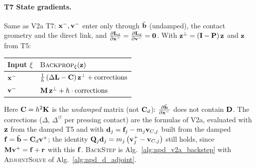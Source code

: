 \paragraph{T7 State gradients.}\mbox{}
\newline Same as V2a T7: $\mathbf{x}^-, \mathbf{v}^-$ enter only through $\tilde{\mathbf{b}}$ (undamped), the contact geometry and the direct link, and $\frac{\partial \mathbf{L}_d}{\partial \mathbf{x}^-} = \frac{\partial \mathbf{L}_d}{\partial \mathbf{v}^-} = \mathbf{0}$. With $\mathbf{z}^\perp = \left(\mathbf{I} - \mathbf{P}\right)\mathbf{z}$ and $\mathbf{z}$ from T5:
\begin{center}
\renewcommand{\arraystretch}{1.6}
\begin{tabular}{ll}
\textbf{Input} $\xi$ & $\textsc{Backprop}_\xi(\mathbf{z})$ \\ \hline
$\mathbf{x}^-$ & $\tfrac{1}{h}\left(\Delta\mathbf{L} - \mathbf{C}\right)\mathbf{z}^\perp + \text{corrections}$ \\
$\mathbf{v}^-$ & $\mathbf{M}\,\mathbf{z}^\perp + h\cdot\text{corrections}$ \\
\end{tabular}
\end{center}
\noindent Here $\mathbf{C} = h^2\mathbf{K}$ is the \emph{undamped} matrix (not $\mathbf{C}_d$): $\frac{\partial \tilde{\mathbf{b}}}{\partial \mathbf{x}^-}$ does not contain $\mathbf{D}$. The corrections ($\Delta$, $\Delta^\circlearrowleft$ per pressing contact) are the formulas of V2a, evaluated with $\mathbf{z}$ from the damped T5 and with $\mathbf{d}_j = \mathbf{f}_j - m_j\mathbf{v}_{C,j}$ built from the damped $\mathbf{f} = \tilde{\mathbf{b}} - \mathbf{C}_d\mathbf{v}^+$; the identity $\mathbf{Q}_j\mathbf{d}_j = m_j\left(\mathbf{v}_j^+ - \mathbf{v}_{C,j}\right)$ still holds, since $\mathbf{M}\mathbf{v}^+ = \mathbf{f} + \mathbf{r}$ with this $\mathbf{f}$. \textsc{BackStep} is Alg.~\ref{alg:npd_v2a_backstep} with \textsc{AdjointSolve} of Alg.~\ref{alg:npd_d_adjoint}.

